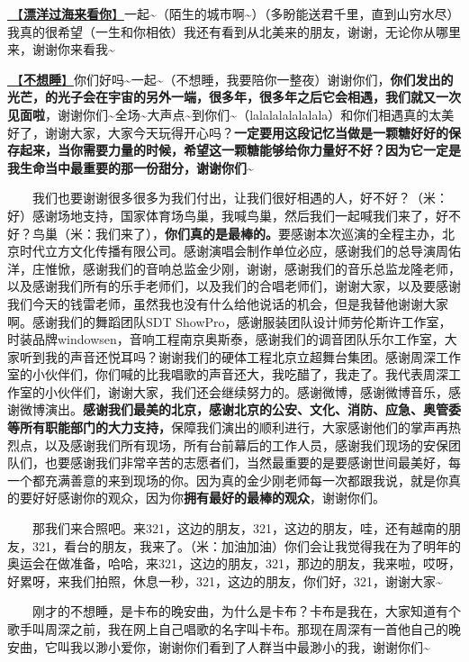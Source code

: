 \documentclass[]{ctexbook}
\begin{document}
\hyperref[across-the-ocean-to-see-you]{🎵【\textbf{漂洋过海来看你}】}一起\textasciitilde（陌生的城市啊\textasciitilde）（多盼能送君千里，直到山穷水尽）我真的很希望（一生和你相依）我还有看到从北美来的朋友，谢谢，无论你从哪里来，谢谢你来看我\textasciitilde{}

\hyperref[keep-playing]{🎵【\textbf{不想睡}】}你们好吗\textasciitilde 一起\textasciitilde（不想睡，我要陪你一整夜）谢谢你们，\textbf{你们发出的光芒，的光子会在宇宙的另外一端，很多年，很多年之后它会相遇，我们就又一次见面啦}，谢谢你们\textasciitilde 全场\textasciitilde 大声点\textasciitilde 到你们\textasciitilde（lalalalalalalala）和你们相遇真的太美好了，谢谢大家，大家今天玩得开心吗？\textbf{一定要用这段记忆当做是一颗糖好好的保存起来，当你需要力量的时候，希望这一颗糖能够给你力量好不好？因为它一定是我生命当中最重要的那一份甜分，谢谢你们\textasciitilde{}}

  我们也要谢谢很多很多为我们付出，让我们很好相遇的人，好不好？（米：好）感谢场地支持，国家体育场鸟巢，我喊鸟巢，然后我们一起喊我们来了，好不好？鸟巢（米：我们来了），\textbf{你们真的是最棒的。}要感谢本次巡演的全程主办，北京时代立方文化传播有限公司。感谢演唱会制作单位必应，感谢我们的总导演周佑洋，庄惟惞，感谢我们的音响总监金少刚，谢谢，感谢我们的音乐总监龙隆老师，以及感谢我们所有的乐手老师们，以及我们的合唱老师们，谢谢大家，以及要感谢我们今天的钱雷老师，虽然我也没有什么给他说话的机会，但是我替他谢谢大家啊。感谢我们的舞蹈团队SDT ShowPro，感谢服装团队设计师劳伦斯许工作室，时装品牌windowsen，音响工程南京奥斯泰，感谢我们的调音团队乐尔工作室，大家听到我的声音还悦耳吗？谢谢我们的硬体工程北京立超舞台集团。感谢周深工作室的小伙伴们，你们喊的比我唱歌的声音还大，我吃醋了，我走了。我代表周深工作室的小伙伴们，谢谢大家，我们还会继续努力的。感谢微博，感谢微博音乐，感谢微博演出。\textbf{感谢我们最美的北京，感谢北京的公安、文化、消防、应急、奥管委等所有职能部门的大力支持，}保障我们演出的顺利进行，大家感谢他们的掌声再热烈点，以及感谢我们所有现场，所有台前幕后的工作人员，感谢我们现场的安保团队们，也要感谢我们非常辛苦的志愿者们，当然最重要的是要感谢世间最美好，每一个都充满善意的来到现场的你。因为真的金少刚老师每一次都跟我说，就是你真的要好好感谢你的观众，因为你\textbf{拥有最好的最棒的观众}，谢谢你们。

  那我们来合照吧。来321，这边的朋友，321，这边的朋友，哇，还有越南的朋友，321，看台的朋友，我来了。（米：加油加油）你们会让我觉得我在为了明年的奥运会在做准备，哈哈，来321，这边的朋友，321，那边的朋友，我来啦，哎呀，好累呀，来我们拍照，休息一秒，321，这边的朋友，你们好，321，谢谢大家\textasciitilde{}

  刚才的不想睡，是卡布的晚安曲，为什么是卡布？卡布是我在，大家知道有个歌手叫周深之前，我在网上自己唱歌的名字叫卡布。那现在周深有一首他自己的晚安曲，它叫我以渺小爱你，谢谢你们看到了人群当中最渺小的我，谢谢你们\textasciitilde{}
\end{document}
